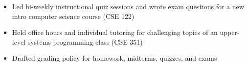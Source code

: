 \begin{itemize}
    \item Led bi-weekly instructional quiz sessions and wrote exam questions for a new intro computer science course (CSE 122)
    \item Held office hours and individual tutoring for challenging topics of an upper-level systems programming class (CSE 351)
    \item Drafted grading policy for homework, midterms, quizzes, and exams
\end{itemize}
